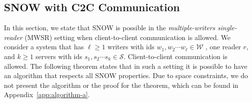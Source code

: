 \vspace{-1.3em}
\subsection{SNOW with C2C Communication}
 \label{subsec:yes_snow_yes_c2c}
\label{sec:mwsr}
In this section, we state that  SNOW is possible in the   \emph{multiple-writers single-reader} 
(MWSR) setting %
 when client-to-client communication is allowed.  
We consider a system that has $\ell \geq 1$ writers with ids $w_1, 
w_2 \cdots w_{\ell} \in \mathcal{W}$ 
, one reader $r$, and  $k \geq 1$ servers with ids $s_1, s_2\cdots s_k \in \mathcal{S}$. 
Client-to-client communication is allowed. 
%
The following theorem states that in such a setting  it is possible to have an algorithm  that respects all SNOW properties. Due to space constraints, we do not present the algorithm or the proof for the theorem, which can be found in Appendix~\ref{app:algorithm-a}. %


		

